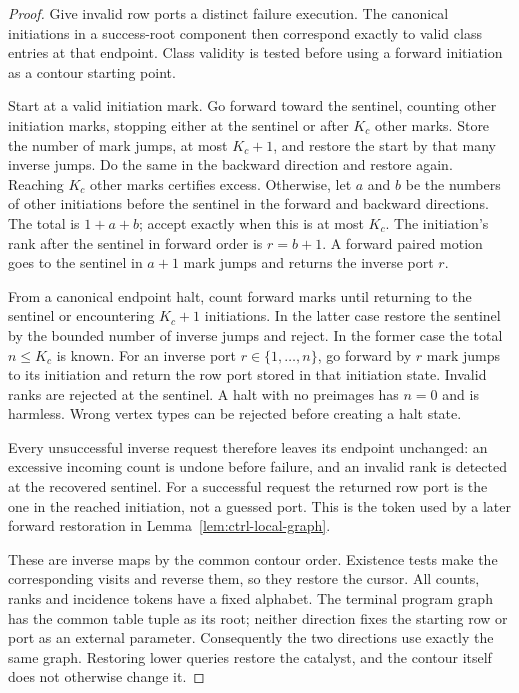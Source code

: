 \begin{proof}
Give invalid row ports a distinct failure execution.  The canonical
initiations in a success-root component then correspond exactly to
valid class entries at that endpoint.  Class validity is tested before
using a forward initiation as a contour starting point.

Start at a valid initiation mark.  Go forward toward the sentinel,
counting other initiation marks, stopping either at the sentinel or
after $K_c$ other marks.  Store the number of mark jumps, at most
$K_c+1$, and restore the start by that many inverse jumps.  Do the same
in the backward direction and restore again.  Reaching $K_c$ other
marks certifies excess.  Otherwise, let $a$ and $b$ be the numbers of
other initiations before the sentinel in the forward and backward
directions.  The total is $1+a+b$; accept exactly when this is at most
$K_c$.  The initiation's rank after the sentinel in forward order is
$r=b+1$.  A forward paired motion goes to the sentinel in $a+1$ mark
jumps and returns the inverse port $r$.

From a canonical endpoint halt, count forward marks until returning to
the sentinel or encountering $K_c+1$ initiations.  In the latter case
restore the sentinel by the bounded number of inverse jumps and
reject.  In the former case the total $n\le K_c$ is known.  For an
inverse port $r\in\{1,\ldots,n\}$, go forward by $r$ mark jumps to its
initiation and return the row port stored in that initiation state.
Invalid ranks are rejected at the sentinel.  A halt with no preimages
has $n=0$ and is harmless.  Wrong vertex types can be rejected before
creating a halt state.

Every unsuccessful inverse request therefore leaves its endpoint
unchanged: an excessive incoming count is undone before failure, and an
invalid rank is detected at the recovered sentinel.  For a successful
request the returned row port is the one in the reached initiation,
not a guessed port.  This is the token used by a later forward
restoration in Lemma~\ref{lem:ctrl-local-graph}.

These are inverse maps by the common contour order.  Existence tests
make the corresponding visits and reverse them, so they restore the
cursor.  All counts, ranks and incidence tokens have a fixed alphabet.
The terminal program graph has the common table tuple as its root;
neither direction fixes the starting row or port as an external
parameter.  Consequently the two directions use exactly the same
graph.  Restoring lower queries restore the catalyst, and the contour
itself does not otherwise change it.
\end{proof}

